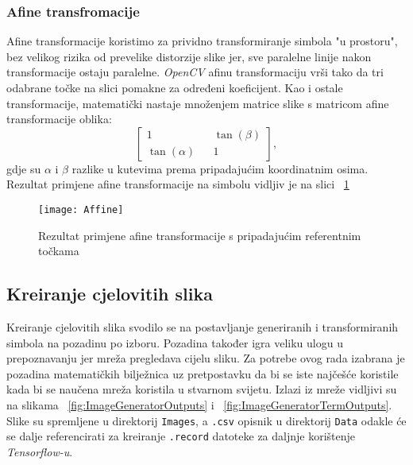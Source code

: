 \subsubsection{Afine transfromacije}
Afine transformacije koristimo za prividno transformiranje simbola "u prostoru", bez velikog rizika od prevelike distorzije slike jer, sve paralelne linije nakon transformacije ostaju paralelne.
\emph{OpenCV} afinu transformaciju vrši tako da tri odabrane točke na slici pomakne za određeni koeficijent.
Kao i ostale transformacije, matematički nastaje množenjem matrice slike s matricom afine transformacije oblika:
$$
\begin{bmatrix}
	1 && \tan(\beta) \\
	\tan(\alpha) && 1
\end{bmatrix} ,
$$
gdje su $\alpha$ i $\beta$ razlike u kutevima prema pripadajućim koordinatnim osima.
Rezultat primjene afine transformacije na simbolu vidljiv je na slici ~\ref{fig:Affine}
\lstset{numbers=left}

\begin{figure}[h!]
	\centering
	\texttt{[image: Affine]}
	 \caption{Rezultat primjene afine transformacije s pripadajućim referentnim točkama}
 	 \label{fig:Affine}
\end{figure}

\subsection{Kreiranje cjelovitih slika}
Kreiranje cjelovitih slika svodilo se na postavljanje generiranih i transformiranih simbola na pozadinu po izboru.
Pozadina također igra veliku ulogu u prepoznavanju jer mreža pregledava cijelu sliku.
Za potrebe ovog rada izabrana je pozadina matematičkih bilježnica uz pretpostavku da bi se iste najčešće koristile kada bi se naučena mreža koristila u stvarnom svijetu.
Izlazi iz mreže vidljivi su na slikama ~\ref{fig:ImageGeneratorOutputs} i ~\ref{fig:ImageGeneratorTermOutputs}.
Slike su spremljene u direktorij \texttt{Images}, a \texttt{.csv} opisnik u direktorij \texttt{Data} odakle će se dalje referencirati za kreiranje \texttt{.record} datoteke za daljnje korištenje \emph{Tensorflow-u}.
\begin{figure}

\end{figure}

